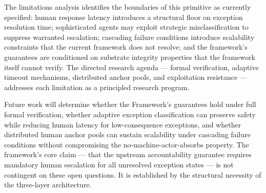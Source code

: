 The limitations analysis identifies the boundaries of this primitive as
currently specified: human response latency introduces a structural floor on
exception resolution time; sophisticated agents may exploit strategic
misclassification to suppress warranted escalation; cascading failure conditions
introduce scalability constraints that the current framework does not resolve;
and the framework's guarantees are conditioned on substrate integrity properties
that the framework itself cannot verify.  The directed research agenda ---
formal verification, adaptive timeout mechanisms, distributed anchor pools, and
exploitation resistance --- addresses each limitation as a principled research
program.

Future work will determine whether the \bxthree{} Framework's guarantees hold
under full formal verification, whether adaptive exception classification can
preserve safety while reducing human latency for low-consequence exceptions,
and whether distributed human anchor pools can sustain scalability under
cascading failure conditions without compromising the no-machine-actor-absorbs
property.  The framework's core claim --- that the upstream accountability
guarantee requires mandatory human escalation for all unresolved exception
states --- is not contingent on these open questions.  It is established by
the structural necessity of the three-layer architecture.